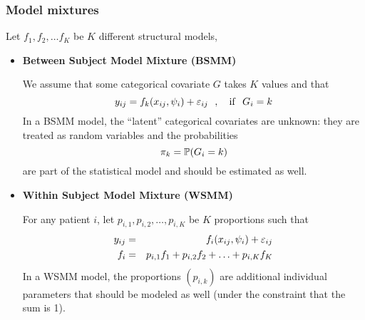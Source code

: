 \subsubsection{Model mixtures}
Let $f_1,f_2,\ldots f_K$ be $K$ different structural models,
\begin{itemize}
\item {\bf Between Subject Model Mixture (BSMM)}

We assume that some categorical covariate  $G$ takes $K$ values and that
$$
y_{ij}=f_k(x_{ij},{\psi_i})+ \varepsilon_{ij}
\ \ ,
 \ \ \ {\rm if } \ \ G_i=k
 $$
In a BSMM model, the ``latent'' categorical covariates are unknown: they are treated as random variables and the probabilities
$$\pi_k = \mathbb{P}\!\left(G_i=k\right)$$
are part of the statistical model and should be estimated as well.
\item {\bf Within Subject Model Mixture (WSMM)}

For any patient $i$, let $p_{i,1}, p_{i,2}, \ldots , p_{i,K}$ be $K$ proportions such that
\begin{eqnarray*}
y_{ij} &=& f_i(x_{ij},{\psi_i})+ \varepsilon_{ij}  \\
f_i&=& p_{i,1}f_1 + p_{i,2}f_2 + \ldots + p_{i,K}f_K
\end{eqnarray*}
In a WSMM model, the proportions $(p_{i,k})$ are additional individual parameters that should be modeled as well (under the constraint that the sum is 1).
\end{itemize}




